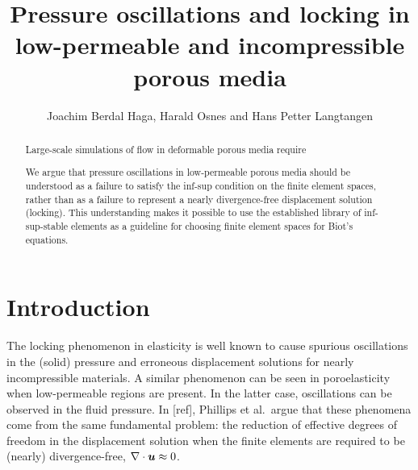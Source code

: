 



\noreceived{}%
\norevised{}%
\noaccepted{}%

\title{Pressure oscillations and locking in low-permeable and incompressible porous media}
\author{
  Joachim Berdal Haga\comma{}\comma\corrauth,
  Harald Osnes\comma{} and
  Hans Petter Langtangen\comma{}}
\address{%
\ Scientific Computing Department, Simula Research Laboratory, Norway\\
\ Department of Mathematics, University of Oslo, Norway\\
\ Department of Informatics, University of Oslo, Norway\\
\todop{\version}
}

\begin{abstract}
%
Large-scale simulations of flow in deformable porous media require

We argue that pressure oscillations in low-permeable porous media should be
understood as a failure to satisfy the inf-sup condition on the finite element
spaces, rather than as a failure to represent a nearly divergence-free
displacement solution (locking).
This understanding makes it possible to use the established library of
inf-sup-stable elements as a guideline for choosing finite element spaces
for Biot's equations.
\end{abstract}

\section{Introduction}
The locking phenomenon in elasticity is well known to cause spurious
oscillations in the (solid) pressure and erroneous displacement solutions for
nearly incompressible materials.
A similar phenomenon can be seen in poroelasticity when low-permeable regions
are present.
In the latter case, oscillations can be observed in the fluid pressure. In
[ref], Phillips et al.~argue that these phenomena come from the same
fundamental problem: the reduction of effective degrees of freedom in the
displacement solution when the finite elements are required to be (nearly)
divergence-free, $\nabla \cdot \boldsymbol{u}\approx 0$.

